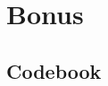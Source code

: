 \documentclass[11pt, a4paper]{article}
\begin{document}
\section{Bonus}
\label{sec:Bonus}

\begin{appendices}
	\section{Codebook}
	\label{appendix:codebook}
	
\end{appendices}
\end{document}
